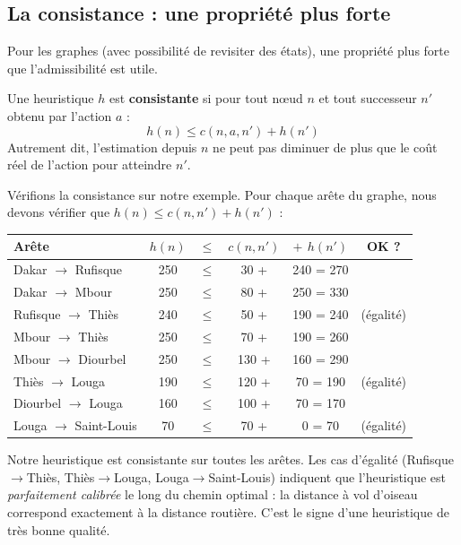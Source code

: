 \documentclass[11pt,a4paper]{article}
\newcommand{\cmark}{\ding{51}}
\begin{document}
\subsection{La consistance : une propriété plus forte}

Pour les graphes (avec possibilité de revisiter des états), une propriété plus forte que l'admissibilité est utile.

\begin{definitionbox}
Une heuristique $h$ est \textbf{consistante} si pour tout nœud $n$ et tout successeur $n'$ obtenu par l'action $a$ :
$$h(n) \leq c(n, a, n') + h(n')$$
Autrement dit, l'estimation depuis $n$ ne peut pas diminuer de plus que le coût réel de l'action pour atteindre $n'$.
\end{definitionbox}

Vérifions la consistance sur notre exemple. Pour chaque arête du graphe, nous devons vérifier que $h(n) \leq c(n, n') + h(n')$ :

\begin{center}
\begin{tabular}{lccccc}
\toprule
\textbf{Arête} & $h(n)$ & $\leq$ & $c(n,n')$ & $+$ $h(n')$ & \textbf{OK ?} \\
\midrule
Dakar $\rightarrow$ Rufisque & 250 & $\leq$ & 30 + & 240 = 270 & \cmark \\
Dakar $\rightarrow$ Mbour & 250 & $\leq$ & 80 + & 250 = 330 & \cmark \\
Rufisque $\rightarrow$ Thiès & 240 & $\leq$ & 50 + & 190 = 240 & \cmark{} (égalité) \\
Mbour $\rightarrow$ Thiès & 250 & $\leq$ & 70 + & 190 = 260 & \cmark \\
Mbour $\rightarrow$ Diourbel & 250 & $\leq$ & 130 + & 160 = 290 & \cmark \\
Thiès $\rightarrow$ Louga & 190 & $\leq$ & 120 + & 70 = 190 & \cmark{} (égalité) \\
Diourbel $\rightarrow$ Louga & 160 & $\leq$ & 100 + & 70 = 170 & \cmark \\
Louga $\rightarrow$ Saint-Louis & 70 & $\leq$ & 70 + & 0 = 70 & \cmark{} (égalité) \\
\bottomrule
\end{tabular}
\end{center}

Notre heuristique est consistante sur toutes les arêtes. Les cas d'égalité (Rufisque$\rightarrow$Thiès, Thiès$\rightarrow$Louga, Louga$\rightarrow$Saint-Louis) indiquent que l'heuristique est \textit{parfaitement calibrée} le long du chemin optimal : la distance à vol d'oiseau correspond exactement à la distance routière. C'est le signe d'une heuristique de très bonne qualité.
\end{document}
